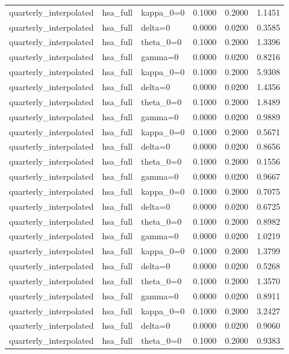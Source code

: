 \begin{tabular}{lllrrr}
quarterly\_interpolated & hsa\_full & kappa\_0=0 & 0.1000 & 0.2000 & 1.1451 \\
quarterly\_interpolated & hsa\_full & delta=0 & 0.0000 & 0.0200 & 0.3585 \\
quarterly\_interpolated & hsa\_full & theta\_0=0 & 0.1000 & 0.2000 & 1.3396 \\
quarterly\_interpolated & hsa\_full & gamma=0 & 0.0000 & 0.0200 & 0.8216 \\
quarterly\_interpolated & hsa\_full & kappa\_0=0 & 0.1000 & 0.2000 & 5.9308 \\
quarterly\_interpolated & hsa\_full & delta=0 & 0.0000 & 0.0200 & 1.4356 \\
quarterly\_interpolated & hsa\_full & theta\_0=0 & 0.1000 & 0.2000 & 1.8489 \\
quarterly\_interpolated & hsa\_full & gamma=0 & 0.0000 & 0.0200 & 0.9889 \\
quarterly\_interpolated & hsa\_full & kappa\_0=0 & 0.1000 & 0.2000 & 0.5671 \\
quarterly\_interpolated & hsa\_full & delta=0 & 0.0000 & 0.0200 & 0.8656 \\
quarterly\_interpolated & hsa\_full & theta\_0=0 & 0.1000 & 0.2000 & 0.1556 \\
quarterly\_interpolated & hsa\_full & gamma=0 & 0.0000 & 0.0200 & 0.9667 \\
quarterly\_interpolated & hsa\_full & kappa\_0=0 & 0.1000 & 0.2000 & 0.7075 \\
quarterly\_interpolated & hsa\_full & delta=0 & 0.0000 & 0.0200 & 0.6725 \\
quarterly\_interpolated & hsa\_full & theta\_0=0 & 0.1000 & 0.2000 & 0.8982 \\
quarterly\_interpolated & hsa\_full & gamma=0 & 0.0000 & 0.0200 & 1.0219 \\
quarterly\_interpolated & hsa\_full & kappa\_0=0 & 0.1000 & 0.2000 & 1.3799 \\
quarterly\_interpolated & hsa\_full & delta=0 & 0.0000 & 0.0200 & 0.5268 \\
quarterly\_interpolated & hsa\_full & theta\_0=0 & 0.1000 & 0.2000 & 1.3570 \\
quarterly\_interpolated & hsa\_full & gamma=0 & 0.0000 & 0.0200 & 0.8911 \\
quarterly\_interpolated & hsa\_full & kappa\_0=0 & 0.1000 & 0.2000 & 3.2427 \\
quarterly\_interpolated & hsa\_full & delta=0 & 0.0000 & 0.0200 & 0.9060 \\
quarterly\_interpolated & hsa\_full & theta\_0=0 & 0.1000 & 0.2000 & 0.9383 \\

\end{tabular}
